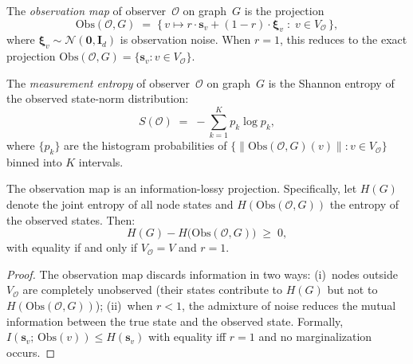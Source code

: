 \begin{definition}
\label{def:11.32}
The \emph{observation map} of observer~$\mathcal{O}$ on graph~$G$ is
the projection
\begin{equation}
\label{eq:11.observation}
  \mathrm{Obs}(\mathcal{O}, G)
  \;=\;
  \bigl\{\,
    v \mapsto r \cdot \mathbf{s}_v + (1 - r) \cdot \boldsymbol{\xi}_v
    \;:\;
    v \in V_{\mathcal{O}}
  \,\bigr\},
\end{equation}
where $\boldsymbol{\xi}_v \sim \mathcal{N}(\mathbf{0}, \mathbf{I}_d)$
is observation noise.  When $r = 1$, this reduces to the exact
projection $\mathrm{Obs}(\mathcal{O}, G) = \{\mathbf{s}_v : v \in
V_{\mathcal{O}}\}$.
\end{definition}

\begin{definition}
\label{def:11.33}
The \emph{measurement entropy} of observer~$\mathcal{O}$ on graph~$G$
is the Shannon entropy of the observed state-norm distribution:
\begin{equation}
\label{eq:11.meas_entropy}
  S(\mathcal{O})
  \;=\;
  -\sum_{k=1}^{K} p_k \log p_k,
\end{equation}
where $\{p_k\}$ are the histogram probabilities of
$\{\|\mathrm{Obs}(\mathcal{O}, G)(v)\| : v \in V_{\mathcal{O}}\}$
binned into $K$ intervals.
\end{definition}

\begin{lemma}
\label{lem:11.4}
The observation map is an information-lossy projection.  Specifically,
let $H(G)$ denote the joint entropy of all node states and
$H(\mathrm{Obs}(\mathcal{O}, G))$ the entropy of the observed states.
Then:
\begin{equation}
\label{eq:11.info_loss}
  H(G) - H\!\bigl(\mathrm{Obs}(\mathcal{O}, G)\bigr)
  \;\geq\; 0,
\end{equation}
with equality if and only if $V_{\mathcal{O}} = V$ and $r = 1$.
\end{lemma}

\begin{proof}
The observation map discards information in two ways:
(i)~nodes outside $V_{\mathcal{O}}$ are completely unobserved (their
states contribute to $H(G)$ but not to
$H(\mathrm{Obs}(\mathcal{O},G))$);
(ii)~when $r < 1$, the admixture of noise reduces the mutual
information between the true state and the observed state.
Formally, $I(\mathbf{s}_v;\, \mathrm{Obs}(v)) \leq H(\mathbf{s}_v)$
with equality iff $r = 1$ and no marginalization occurs.
\end{proof}

